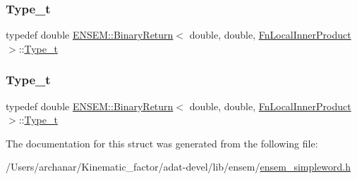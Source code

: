 \mbox{\label{structENSEM_1_1BinaryReturn_3_01double_00_01double_00_01FnLocalInnerProduct_01_4_a086cf9ffa1dbc1fba4c959bf0ae38e60}} 
\subsubsection{\texorpdfstring{Type\_t}{Type\_t}\hspace{0.1cm}{\footnotesize\ttfamily [2/3]}}
{\footnotesize\ttfamily typedef double \mbox{\hyperlink{structENSEM_1_1BinaryReturn}{E\+N\+S\+E\+M\+::\+Binary\+Return}}$<$ double, double, \mbox{\hyperlink{structENSEM_1_1FnLocalInnerProduct}{Fn\+Local\+Inner\+Product}} $>$\+::\mbox{\hyperlink{structENSEM_1_1BinaryReturn_3_01double_00_01double_00_01FnLocalInnerProduct_01_4_a086cf9ffa1dbc1fba4c959bf0ae38e60}{Type\+\_\+t}}}

\mbox{\label{structENSEM_1_1BinaryReturn_3_01double_00_01double_00_01FnLocalInnerProduct_01_4_a086cf9ffa1dbc1fba4c959bf0ae38e60}} 
\subsubsection{\texorpdfstring{Type\_t}{Type\_t}\hspace{0.1cm}{\footnotesize\ttfamily [3/3]}}
{\footnotesize\ttfamily typedef double \mbox{\hyperlink{structENSEM_1_1BinaryReturn}{E\+N\+S\+E\+M\+::\+Binary\+Return}}$<$ double, double, \mbox{\hyperlink{structENSEM_1_1FnLocalInnerProduct}{Fn\+Local\+Inner\+Product}} $>$\+::\mbox{\hyperlink{structENSEM_1_1BinaryReturn_3_01double_00_01double_00_01FnLocalInnerProduct_01_4_a086cf9ffa1dbc1fba4c959bf0ae38e60}{Type\+\_\+t}}}



The documentation for this struct was generated from the following file\+:\begin{DoxyCompactItemize}
\item 
/\+Users/archanar/\+Kinematic\+\_\+factor/adat-\/devel/lib/ensem/\mbox{\hyperlink{adat-devel_2lib_2ensem_2ensem__simpleword_8h}{ensem\+\_\+simpleword.\+h}}\end{DoxyCompactItemize}
